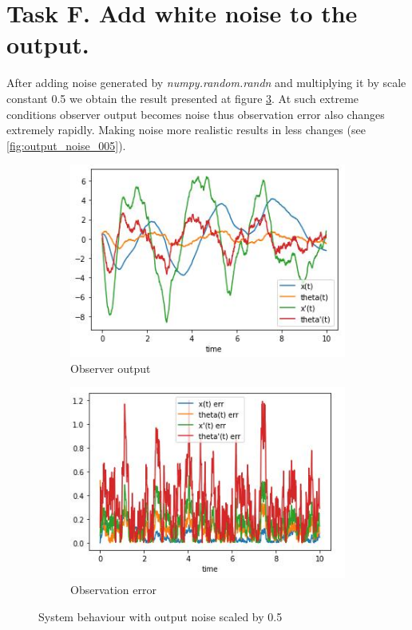 \documentclass[12pt,letterpaper]{article}
\begin{document}
\section*{Task F. Add white noise to the output.}
\label{Q:F}
    After adding noise generated by \textit{numpy.random.randn} and multiplying it by scale constant 0.5 we obtain the result presented at figure \ref{fig:output_noise_05}. At such extreme conditions observer output becomes noise thus observation error also changes extremely rapidly. Making noise more realistic results in less changes (see \ref{fig:output_noise_005}). 

    
    \begin{figure}[htb]
        \begin{subfigure}{.5\textwidth}
            \centering
        \includegraphics[width=1\linewidth]{images/filter/output_noise_05.jpg}
        \caption{Observer output}
        \label{fig:output_noise_05_obs}
        \end{subfigure}
        \begin{subfigure}{.5\textwidth}
          \centering
          \includegraphics[width=1\linewidth]{images/filter/output_noise_05_err.jpg}
          \caption{Observation error}
        \label{fig:output_noise_05_err}
        \end{subfigure}
    \caption{System behaviour with output noise scaled by 0.5}
    \label{fig:output_noise_05}
    \end{figure}
    
\end{document}
